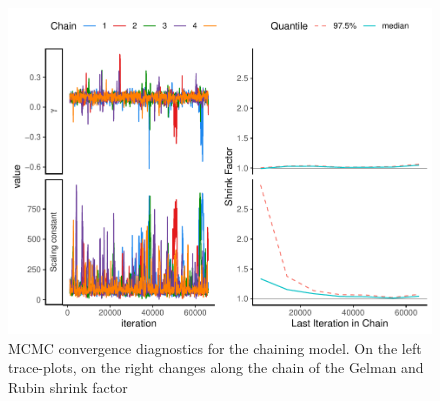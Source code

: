 \documentclass[
  12pt,
]{article}
\begin{document}
\begin{figure}
\includegraphics[width=1\linewidth]{manuscript_BE_files/figure-latex/diaggamPAA-1} \caption{MCMC convergence diagnostics for the chaining model. On the left trace-plots, on the right changes along the chain of the Gelman and Rubin shrink factor }\label{fig:diaggamPAA}
\end{figure}
\end{document}
